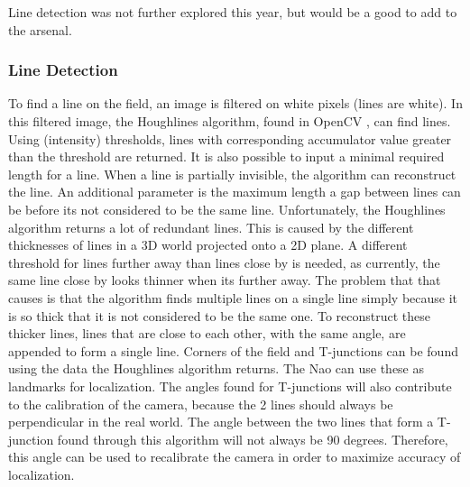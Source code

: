 \documentclass[11pt,a4paper,oneside]{article}
\begin{document}
Line detection was not further explored this year, but would be a good to add to the arsenal.


\subsubsection{Line Detection}
To find a line on the field, an image is filtered on white pixels (lines are white). In this filtered image, the Houghlines algorithm, found in OpenCV \cite[p.~156]{Bradski2008}, can find lines. Using (intensity) thresholds, lines with corresponding accumulator value greater than the threshold are returned. It is also possible to input a minimal required length for a line. When a line is partially invisible, the algorithm can reconstruct the line. An additional parameter is the maximum length a gap between lines can be before its not considered to be the same line. 
Unfortunately, the Houghlines algorithm returns a lot of redundant lines. This is caused by the different thicknesses of lines in a 3D world projected onto a 2D plane. A different threshold for lines further away than lines close by is needed, as currently, the same line close by looks thinner when its further away. The problem that that causes is that the algorithm finds multiple lines on a single line simply because it is so thick that it is not considered to be the same one. To reconstruct these thicker lines, lines that are close to each other, with the same angle, are appended to form a single line. 
Corners of the field and T-junctions can be found using the data the Houghlines algorithm returns. The Nao can use these as landmarks for localization. The angles found for T-junctions will also contribute to the calibration of the camera, because the 2 lines should always be perpendicular in the real world. The angle between the two lines that form a T-junction found through this algorithm will not always be 90 degrees. Therefore, this angle can be used to recalibrate the camera in order to maximize accuracy of localization. 
\end{document}
